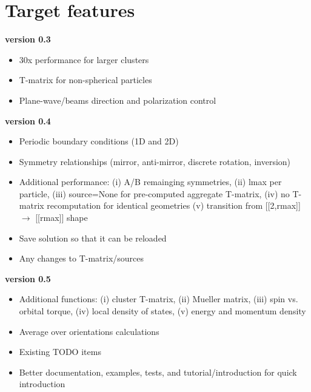 \documentclass[11pt]{article}
\begin{document}
\section{Target features}

\begin{enumerate*}
    \item \textbf{version 0.3}
        \begin{itemize}[label={\tiny\raisebox{1ex}{\textbullet}}]
            \item 30x performance for larger clusters
            \item T-matrix for non-spherical particles
            \item Plane-wave/beams direction and polarization control
        \end{itemize}
    \item \textbf{version 0.4}
        \begin{itemize}[label={\tiny\raisebox{1ex}{\textbullet}}]
            \item Periodic boundary conditions (1D and 2D)
            \item Symmetry relationships (mirror, anti-mirror, discrete rotation, inversion)
            \item Additional performance: 
                        (i) A/B remainging symmetries, 
                        (ii) lmax per particle,
                        (iii) source=None for pre-computed aggregate T-matrix,
                        (iv) no T-matrix recomputation for identical geometries
                        (v) transition from [[2,rmax]] $\rightarrow$ [[rmax]] shape
            \item Save solution so that it can be reloaded
            \item Any changes to T-matrix/sources
        \end{itemize}
    \item \textbf{version 0.5}
        \begin{itemize}[label={\tiny\raisebox{1ex}{\textbullet}}]
            \item Additional functions: 
                       (i) cluster T-matrix,
                       (ii) Mueller matrix,
                       (iii) spin vs. orbital torque,
                       (iv) local density of states,
                       (v) energy and momentum density
            \item Average over orientations calculations
            \item Existing TODO items
            \item Better documentation, examples, tests, and tutorial/introduction for quick introduction

\end{itemize}
\end{enumerate*}
\end{document}
